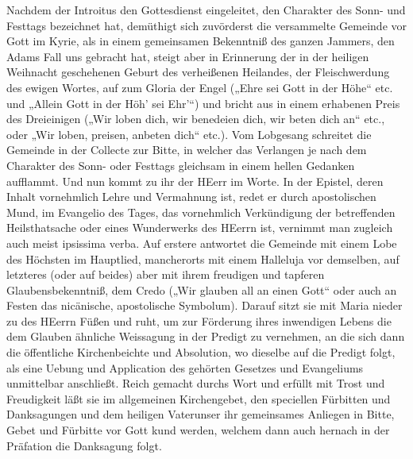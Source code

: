 Nachdem der Introitus den Gottesdienst eingeleitet, den Charakter des Sonn- und Festtags bezeichnet hat, demüthigt sich zuvörderst die versammelte Gemeinde vor Gott im Kyrie, als in einem gemeinsamen Bekenntniß des ganzen Jammers, den Adams Fall uns gebracht hat, steigt aber in Erinnerung der in der heiligen Weihnacht geschehenen Geburt des verheißenen Heilandes, der Fleischwerdung des ewigen Wortes, auf zum Gloria der Engel („Ehre sei Gott in der Höhe“ etc. und „Allein Gott in der Höh’ sei Ehr’“) und bricht aus in einem erhabenen Preis des Dreieinigen („Wir loben dich, wir benedeien dich, wir beten dich an“ etc., oder „Wir loben, preisen, anbeten dich“ etc.). Vom Lobgesang schreitet die Gemeinde in der Collecte zur Bitte, in welcher das Verlangen je nach dem Charakter des Sonn- oder Festtags gleichsam in einem hellen Gedanken aufflammt. Und nun kommt zu ihr der HEerr im Worte. In der Epistel, deren Inhalt vornehmlich Lehre und Vermahnung ist, redet er durch apostolischen Mund, im Evangelio des Tages, das vornehmlich Verkündigung der betreffenden Heilsthatsache oder eines Wunderwerks des HEerrn ist, vernimmt man zugleich auch meist ipsissima verba. Auf erstere antwortet die Gemeinde mit einem Lobe des Höchsten im Hauptlied, mancherorts mit einem Halleluja vor demselben, auf letzteres (oder auf beides) aber mit ihrem freudigen und tapferen Glaubensbekenntniß, dem Credo („Wir glauben all an einen Gott“ oder auch an Festen das nicänische, apostolische Symbolum). Darauf sitzt sie mit Maria nieder zu des HEerrn Füßen und ruht, um zur Förderung ihres inwendigen Lebens die dem Glauben ähnliche Weissagung in der Predigt zu vernehmen, an die sich dann die öffentliche Kirchenbeichte
und Absolution, wo dieselbe auf die Predigt folgt, als eine Uebung und Application des gehörten Gesetzes und Evangeliums unmittelbar anschließt. Reich gemacht durchs Wort und erfüllt mit Trost und Freudigkeit läßt sie im allgemeinen Kirchengebet, den speciellen Fürbitten und Danksagungen und dem heiligen Vaterunser ihr gemeinsames Anliegen in Bitte, Gebet und Fürbitte vor Gott kund werden, welchem dann auch hernach in der Präfation die Danksagung folgt.

